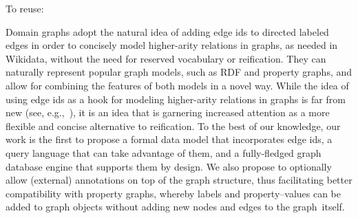 To reuse:

Domain graphs adopt the natural idea of adding edge ids to directed labeled edges in order to concisely model higher-arity relations in graphs, as needed in Wikidata, without the need for reserved vocabulary or reification. They can naturally represent popular graph models, such as RDF and property graphs, and allow for combining the features of both models in a novel way. While the idea of using edge ids as a hook for modeling higher-arity relations in graphs is far from new (see, e.g.,~\cite{HernandezHK15,IlievskiGCDYRLL20,LassilaSBBBKKLST}), it is an idea that is garnering increased attention as a more flexible and concise alternative to reification.
To the best of our knowledge, our work is the first to propose a formal data model that incorporates edge ids, a query language that can take advantage of them, and a fully-fledged graph database engine that supports them by design. We also propose to optionally allow (external) annotations on top of the graph structure, thus facilitating better compatibility with property graphs, whereby labels and property--values can be added to graph objects without adding new nodes and edges to the graph~itself.

